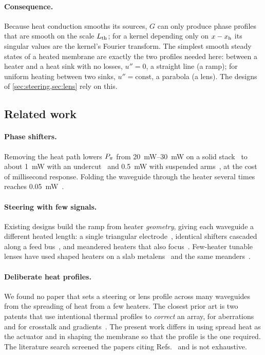 \paragraph{Consequence.} Because heat conduction smooths its sources, $G$ can only produce phase profiles that are
smooth on the scale $L_{\mathrm{th}}$; for a kernel depending only on $x-x_{\mathrm{h}}$ its singular values are the kernel's Fourier
transform. The simplest smooth steady states of a heated membrane are exactly the two profiles needed here: between
a heater and a heat sink with no losses, $u''=0$, a straight line (a ramp); for uniform heating between two sinks,
$u''=\text{const}$, a parabola (a lens). The designs of \cref{sec:steering,sec:lens} rely on this.

\subsection{Related work}
\label{sec:related}

\paragraph{Phase shifters.} Removing the heat path lowers $P_{\pi}$ from \qtyrange{20}{30}{\milli\watt} on a solid
stack~\cite{jacques2019} to about \qty{1}{\milli\watt} with an undercut~\cite{parsons2025} and
\qty{0.5}{\milli\watt} with suspended arms~\cite{fang2011}, at the cost of millisecond response. Folding the
waveguide through the heater several times reaches \qty{0.05}{\milli\watt}~\cite{lu2015}.

\paragraph{Steering with few signals.} Existing designs build the ramp from heater \emph{geometry}, giving each
waveguide a different heated length: a single triangular electrode~\cite{vanacoleyen2009}, identical shifters
cascaded along a feed bus~\cite{yaacobi2014,poulton2016}, and meandered heaters that also
focus~\cite{hosseini2025}. Few-heater tunable lenses have used shaped heaters on a slab
metalens~\cite{liu2023} and the same meanders~\cite{hosseini2025}.

\paragraph{Deliberate heat profiles.} We found no paper that sets a steering or lens profile across many
waveguides from the spreading of heat from a few heaters. The closest prior art is two patents that use
intentional thermal profiles to \emph{correct} an array, for aberrations~\cite{us10976542} and for crosstalk and
gradients~\cite{us10775559}. The present work differs in using spread heat as the actuator and in shaping
the membrane so that the profile is the one required. The literature search screened the papers citing
Refs.~\cite{vanacoleyen2009,yaacobi2014} and is not exhaustive.
